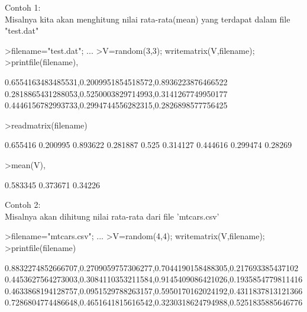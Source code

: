 \documentclass[a4paper,10pt]{article}
\begin{document}
\begin{eulernotebook}
\begin{eulercomment}
Contoh 1:\\
Misalnya kita akan menghitung nilai rata-rata(mean) yang terdapat
dalam file "test.dat"
\end{eulercomment}
\begin{eulerprompt}
>filename="test.dat"; ...
>V=random(3,3); writematrix(V,filename);
>printfile(filename),
\end{eulerprompt}
\begin{euleroutput}
  0.6554163483485531,0.2009951854518572,0.8936223876466522
  0.2818865431288053,0.5250003829714993,0.3141267749950177
  0.4446156782993733,0.2994744556282315,0.2826898577756425
  
\end{euleroutput}
\begin{eulerprompt}
>readmatrix(filename)
\end{eulerprompt}
\begin{euleroutput}
       0.655416      0.200995      0.893622 
       0.281887         0.525      0.314127 
       0.444616      0.299474       0.28269 
\end{euleroutput}
\begin{eulerprompt}
>mean(V),
\end{eulerprompt}
\begin{euleroutput}
       0.583345 
       0.373671 
        0.34226 
\end{euleroutput}
\begin{eulercomment}
Contoh 2:\\
Misalnya akan dihitung nilai rata-rata dari file 'mtcars.csv'
\end{eulercomment}
\begin{eulerprompt}
>filename="mtcars.csv";  ...
>V=random(4,4); writematrix(V,filename);
>printfile(filename)
\end{eulerprompt}
\begin{euleroutput}
  0.8832274852666707,0.2709059757306277,0.7044190158488305,0.217693385437102
  0.4453627564273003,0.3084110353211584,0.9145409086421026,0.1935854779811416
  0.4633868194128757,0.0951529788263157,0.5950170162024192,0.4311837813121366
  0.7286804774486648,0.4651641815616542,0.3230318624794988,0.5251835885646776
  

\end{euleroutput}
\end{eulernotebook}
\end{document}
